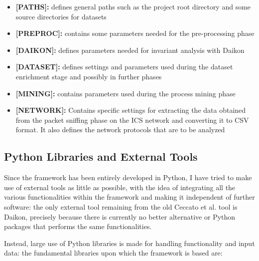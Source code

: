 \begin{itemize}
	\item \textbf{[PATHS]:} defines general paths such as the project root directory and some source directories for datasets
	
	\item \textbf{[PREPROC]:} contains some parameters needed for the pre-processing phase
	
	\item \textbf{[DAIKON]:} defines parameters needed for invariant analysis with Daikon
	
	\item \textbf{[DATASET]:} defines settings and parameters used during the dataset enrichment stage and possibly in further phases
	
	\item \textbf{[MINING]:} contains parameters used during the process mining phase
	
	\item \textbf{[NETWORK]:} Contains specific settings for extracting the data obtained from the packet sniffing phase on the ICS network and converting it to CSV format. It also defines the network protocols that are to be analyzed
\end{itemize}

\subsection{Python Libraries and External Tools}
\label{subsec:4_tools_libraries}
Since the framework has been entirely developed in Python, I have tried to make use of external tools as little as possible, with the idea of integrating all the various functionalities within the framework and making it independent of further software: the only external tool remaining from the old Ceccato et al. tool is Daikon, precisely because there is currently no better alternative or Python packages that performs the same functionalities.

\bigskip
Instead, large use of Python libraries is made for handling functionality and input data: the fundamental libraries upon which the framework is based are:

